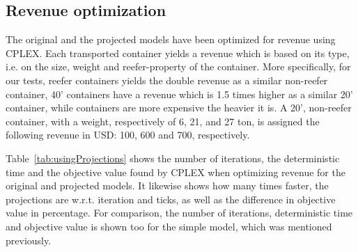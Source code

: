 \subsection{Revenue optimization}
The original and the projected models have been optimized for revenue using CPLEX. 
Each transported container yields a revenue which is based on its type, i.e. on the size, weight and reefer-property of the container. More specifically, for our tests, reefer containers yields the double revenue as a similar non-reefer container, 40' containers have a revenue which is 1.5 times higher as a similar 20' container, while containers are more expensive the heavier it is. A 20', non-reefer container, with a weight, respectively of 6, 21, and 27 ton, is assigned the following revenue in USD: 100, 600 and 700, respectively.   

Table~\ref{tab:usingProjections} shows the number of iterations, the deterministic time and the objective value found by CPLEX when optimizing revenue for the original and projected models. It likewise shows how many times faster, the projections are w.r.t. iteration and ticks, as well as the difference in objective value in percentage. For comparison, the number of iterations, deterministic time and objective value is shown too for the simple model, which was mentioned previously.

